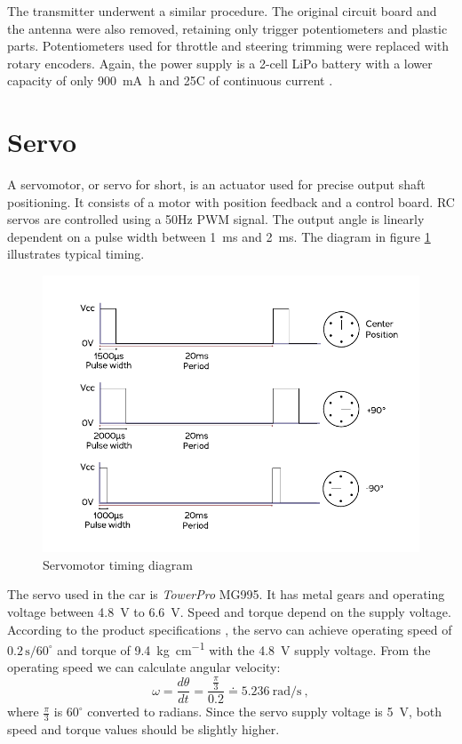 The transmitter underwent a similar procedure. The original circuit board and the antenna were also removed, retaining only trigger potentiometers and plastic parts. Potentiometers used for throttle and steering trimming were replaced with rotary encoders. Again, the power supply is a 2-cell LiPo battery with a lower capacity of only \SI{900}{\milli\A\hour} and 25C of continuous current \cite{lipo_tx}.



\section{Servo}
\label{sec:hw_servo}
A servomotor, or servo for short, is an actuator used for precise output shaft positioning. It consists of a motor with position feedback and a control board. RC servos are controlled using a 50Hz PWM signal. The output angle is linearly dependent on a pulse width between \SI{1}{\ms} and \SI{2}{\ms}. The diagram in figure \ref{fig:servo_control} illustrates typical timing.
\begin{figure}[t]
\centering
\includegraphics[width=0.7\linewidth]{fig/Servomotor_Timing_Diagram.pdf}
\caption{Servomotor timing diagram \cite{servo_control}}
\label{fig:servo_control}
\end{figure}

The servo used in the car is \textit{TowerPro} MG995. It has metal gears and operating voltage between \SI{4.8}{\V} to \SI{6.6}{\V}. Speed and torque depend on the supply voltage. According to the product specifications \cite{mg995}, the servo can achieve operating speed of $0.2\, \text{s}/60^\circ$ and torque of \SI{9.4}{\kg\per\cm} with the \SI{4.8}{\V} supply voltage. From the operating speed we can calculate angular velocity: 
\begin{equation}
\omega = \frac{d \theta}{d t} = \frac{\frac{\pi}{3}}{0.2} \doteq 5.236\ \unit{\radian\per\second}\ ,
\end{equation}
where $\frac{\pi}{3}$ is $60^\circ$ converted to radians.
Since the servo supply voltage is \SI{5}{\V}, both speed and torque values should be slightly higher.


